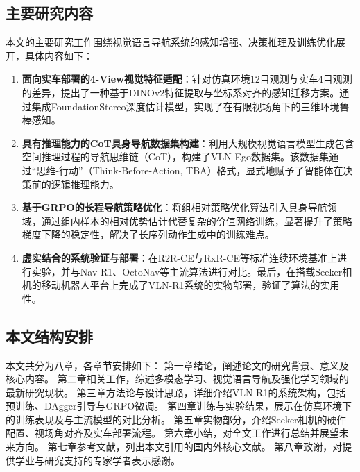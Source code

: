 \subsection{主要研究内容}
本文的主要研究工作围绕视觉语言导航系统的感知增强、决策推理及训练优化展开，具体内容如下：
\begin{enumerate}
    \item \textbf{面向实车部署的4-View视觉特征适配}：针对仿真环境12目观测与实车4目观测的差异，提出了一种基于DINOv2特征提取与坐标系对齐的感知迁移方案。通过集成FoundationStereo深度估计模型，实现了在有限视场角下的三维环境鲁棒感知。
    \item \textbf{具有推理能力的CoT具身导航数据集构建}：利用大规模视觉语言模型生成包含空间推理过程的导航思维链（CoT），构建了VLN-Ego数据集。该数据集通过“思维-行动”（Think-Before-Action, TBA）格式，显式地赋予了智能体在决策前的逻辑推理能力。
    \item \textbf{基于GRPO的长程导航策略优化}：将组相对策略优化算法引入具身导航领域，通过组内样本的相对优势估计代替复杂的价值网络训练，显著提升了策略梯度下降的稳定性，解决了长序列动作生成中的训练难点。
    \item \textbf{虚实结合的系统验证与部署}：在R2R-CE与RxR-CE等标准连续环境基准上进行实验，并与Nav-R1、OctoNav等主流算法进行对比。最后，在搭载Seeker相机的移动机器人平台上完成了VLN-R1系统的实物部署，验证了算法的实用性。
\end{enumerate}

\subsection{本文结构安排}
本文共分为八章，各章节安排如下：
第一章绪论，阐述论文的研究背景、意义及核心内容。
第二章相关工作，综述多模态学习、视觉语言导航及强化学习领域的最新研究现状。
第三章方法论与设计思路，详细介绍VLN-R1的系统架构，包括预训练、DAgger引导与GRPO微调。
第四章训练与实验结果，展示在仿真环境下的训练表现及与主流模型的对比分析。
第五章实物部分，介绍Seeker相机的硬件配置、视场角对齐及实车部署流程。
第六章小结，对全文工作进行总结并展望未来方向。
第七章参考文献，列出本文引用的国内外核心文献。
第八章致谢，对提供学业与研究支持的专家学者表示感谢。
